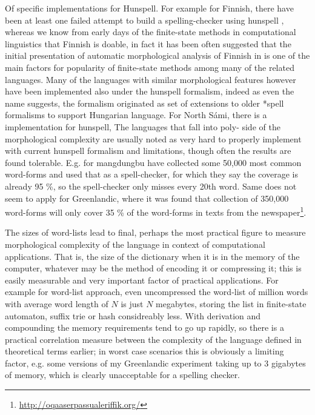 \documentclass[officiallayout,draft]{unihelcompling}
\begin{document}
Of specific implementations for Hunspell. For example for
Finnish, there have been at least one failed attempt to build a
spelling-checker using hunspell \cite{pitkanen2006hunspell}, whereas we know
from early days of the finite-state methods in computational linguistics that
Finnish is doable, in fact it has been often suggested that the initial
presentation of automatic morphological analysis of Finnish in
\cite{koskenniemi1983twolevel} is one of the main factors for popularity of
finite-state methods among many of the related languages. Many of the languages
with similar morphological features however have been implemented also under
the hunspell formalism, indeed as even the name suggests, the formalism
originated as set of extensions to older *spell formalisms to support Hungarian
language. For North Sámi, there is a implementation for hunspell, The languages
that fall into poly- side of the morphological complexity are usually noted as
very hard to properly implement with current hunspell formalism and
limitations, though often the results are found tolerable. E.g. for mangdungbu
\cite{} have collected some 50,000 most common
word-forms and used that as a spell-checker, for which they say the coverage is
already 95 \%, so the spell-checker only misses every 20th word. Same does not
seem to apply for Greenlandic, where it was found that collection of 350,000
word-forms will only cover 35 \% of the word-forms in texts from the
newspaper\footnote{\url{http://oqaaserpassualeriffik.org/}}.

The sizes of word-lists lead to final, perhaps the most practical figure to
measure morphological complexity of the language in context of computational
applications. That is, the size of the dictionary when it is in the memory of
the computer, whatever may be the method of encoding it or compressing it; this
is easily measurable and very important factor of practical applications.
For example for word-list approach, even uncompressed the word-list of million
words with average word length of $N$ is just $N$ megabytes, storing the list in
finite-state automaton, suffix trie or hash considreably less. With derivation
and compounding the memory requirements tend to go up rapidly, so there is
a practical correlation measure between the complexity of the language defined
in theoretical terms earlier; in worst case scenarios this is obviously a 
limiting factor, e.g. some versions of my Greenlandic experiment taking up
to 3 gigabytes of memory, which is clearly unacceptable for a spelling checker.
\end{document}
